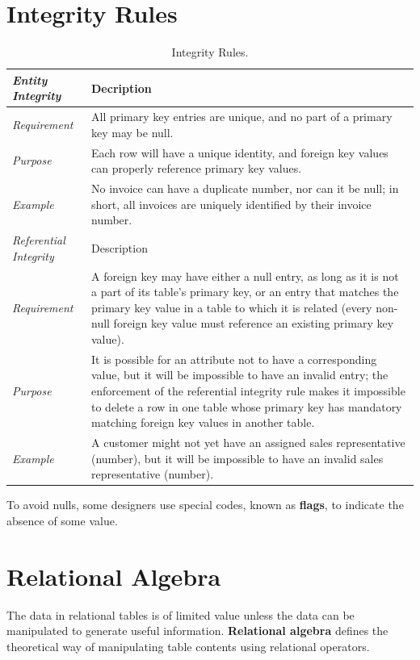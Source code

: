 \documentclass[a4paper, 12pt, titlepage]{report}
\begin{document}
\section{Integrity Rules}
\begin{center}
\begin{longtable}{ p{1.75cm} p{13cm} }
\caption{Integrity Rules.\label{long}}\\
\hline
\hline
\emph{Entity Integrity} & Decription\\
\hline 
\emph{Requirement} & All primary key entries are unique, and no part of a primary key may be null.\\
\emph{Purpose} & Each row will have a unique identity, and foreign key values can properly reference primary key values.\\
\emph{Example} & No invoice can have a duplicate number, nor can it be null; in short, all invoices are uniquely identified by their invoice number.\\
\hline
\emph{Referential Integrity} & Description\\
\hline
\emph{Requirement} & A foreign key may have either a null entry, as long as it is not a part of its table’s primary key, or an entry that matches the primary key value in a table to which it is related (every non-null foreign key value must reference an existing primary key value).\\ 
\emph{Purpose} & It is possible for an attribute not to have a corresponding value, but it will be impossible to have an invalid entry; the enforcement of the referential integrity rule makes it impossible to delete a row in one table whose primary key has mandatory matching foreign key values in another table.\\
\emph{Example} & A customer might not yet have an assigned sales representative (number), but it will be impossible to have an invalid sales representative (number).\\
\hline
\hline
\end{longtable}
\end{center}
To avoid nulls, some designers use special codes, known as \textbf{flags}, to indicate the absence of some value.
\section{Relational Algebra}
The data in relational tables is of limited value unless the data can be manipulated to generate useful information. \textbf{Relational algebra} defines the theoretical way of
manipulating table contents using relational operators.
\end{document}
